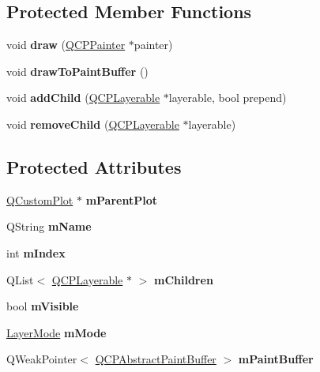 \subsection*{Protected Member Functions}
\begin{DoxyCompactItemize}
\item 
\mbox{\label{classQCPLayer_ab831a99c8d30b15ec4533ca341e8813b}} 
void {\bfseries draw} (\hyperlink{classQCPPainter}{Q\+C\+P\+Painter} $\ast$painter)
\item 
\mbox{\label{classQCPLayer_a4a8e0a86f31462299e7fc8e8158dd2c6}} 
void {\bfseries draw\+To\+Paint\+Buffer} ()
\item 
\mbox{\label{classQCPLayer_a57ce5e49364aa9122276d5df3b4a0ddc}} 
void {\bfseries add\+Child} (\hyperlink{classQCPLayerable}{Q\+C\+P\+Layerable} $\ast$layerable, bool prepend)
\item 
\mbox{\label{classQCPLayer_ac2f64ac7761650582d968d86670ef362}} 
void {\bfseries remove\+Child} (\hyperlink{classQCPLayerable}{Q\+C\+P\+Layerable} $\ast$layerable)
\end{DoxyCompactItemize}
\subsection*{Protected Attributes}
\begin{DoxyCompactItemize}
\item 
\mbox{\label{classQCPLayer_a2f3374a7884bf403720cd1cf6f7ad1bb}} 
\hyperlink{classQCustomPlot}{Q\+Custom\+Plot} $\ast$ {\bfseries m\+Parent\+Plot}
\item 
\mbox{\label{classQCPLayer_a91e6298183cb4b9dfd4efdfaf1ecc220}} 
Q\+String {\bfseries m\+Name}
\item 
\mbox{\label{classQCPLayer_a122088bcab6cec76a52b75ce8606605b}} 
int {\bfseries m\+Index}
\item 
\mbox{\label{classQCPLayer_a704aa71bba469383c3a3c598c1ec0d28}} 
Q\+List$<$ \hyperlink{classQCPLayerable}{Q\+C\+P\+Layerable} $\ast$ $>$ {\bfseries m\+Children}
\item 
\mbox{\label{classQCPLayer_a264950deb08e589460c126c895a1e2b5}} 
bool {\bfseries m\+Visible}
\item 
\mbox{\label{classQCPLayer_a11bd0aa190d8fa21c8c7673d070737c8}} 
\hyperlink{classQCPLayer_a67dcfc1590be2a1f2227c5a39bb59c7c}{Layer\+Mode} {\bfseries m\+Mode}
\item 
\mbox{\label{classQCPLayer_aa0bdbc75e4350a0669ff515b3476a3d3}} 
Q\+Weak\+Pointer$<$ \hyperlink{classQCPAbstractPaintBuffer}{Q\+C\+P\+Abstract\+Paint\+Buffer} $>$ {\bfseries m\+Paint\+Buffer}
\end{DoxyCompactItemize}
